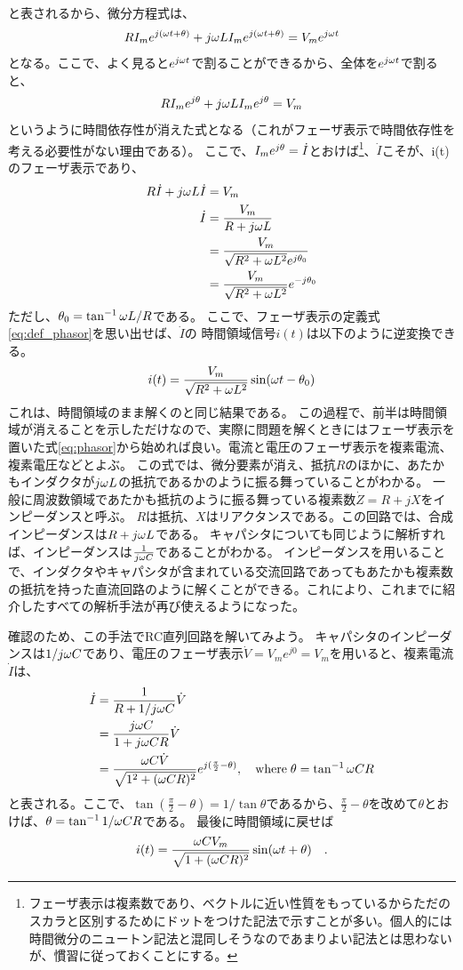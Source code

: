 \documentclass{ltjsreport}
\begin{document}
と表されるから、微分方程式は、
\[
  R I_m e^{j (\omega t + \theta)} + j\omega L I_m e^{j (\omega t + \theta)} = V_m e^{j \omega t}
\]
となる。ここで、よく見ると$e^{j \omega t}$で割ることができるから、全体を$e^{j \omega t}$で割ると、
\[
R I_m e^{j \theta} + j\omega L I_m e^{j \theta} = V_m
\]
というように時間依存性が消えた式となる（これがフェーザ表示で時間依存性を考える必要性がない理由である）。
ここで、$I_m e^{j \theta} = \dot{I}$とおけば\footnote{フェーザ表示は複素数であり、ベクトルに近い性質をもっているからただのスカラと区別するためにドットをつけた記法で示すことが多い。個人的には時間微分のニュートン記法と混同しそうなのであまりよい記法とは思わないが、慣習に従っておくことにする。}、$\dot{I}$こそが、i(t)のフェーザ表示であり、
\begin{align}\label{eq:phasor}
  R \dot{I} + j\omega L \dot{I} &= V_m\\
  \dot{I} &= \frac{V_m}{R+j\omega L}\\
    &= \frac{V_m}{\sqrt{R^2+\omega L^2}e^{j \theta_0}}\\
    &=\frac{V_m}{\sqrt{R^2+\omega L^2}}e^{-j\theta_0}
\end{align}
ただし、$\theta_0 = \tan^{-1}\omega L/R$である。
ここで、フェーザ表示の定義式\eqref{eq:def_phasor}を思い出せば、$\dot{I}$の
時間領域信号$i(t)$は以下のように逆変換できる。
\[
  i(t) = \frac{V_m}{\sqrt{R^2+\omega L^2}}\sin(\omega t - \theta_0)
\]
これは、時間領域のまま解くのと同じ結果である。
この過程で、前半は時間領域が消えることを示しただけなので、実際に問題を解くときにはフェーザ表示を置いた式\eqref{eq:phasor}から始めれば良い。電流と電圧のフェーザ表示を複素電流、複素電圧などとよぶ。
この式では、微分要素が消え、抵抗$R$のほかに、あたかもインダクタが$j\omega L$の抵抗であるかのように振る舞っていることがわかる。
一般に周波数領域であたかも抵抗のように振る舞っている複素数$\dot{Z} = R + jX$をインピーダンスと呼ぶ。
$R$は抵抗、$X$はリアクタンスである。この回路では、合成インピーダンスは$R+j\omega L$である。
キャパシタについても同じように解析すれば、インピーダンスは$\frac{1}{j\omega C}$であることがわかる。
インピーダンスを用いることで、インダクタやキャパシタが含まれている交流回路であってもあたかも複素数の抵抗を持った直流回路のように解くことができる。これにより、これまでに紹介したすべての解析手法が再び使えるようになった。

確認のため、この手法でRC直列回路を解いてみよう。
キャパシタのインピーダンスは$1/j\omega C$であり、電圧のフェーザ表示$\dot{V} =V_m e^{j0}=V_m$を用いると、複素電流$\dot{I}$は、
\begin{align}
  \dot{I} &= \frac{1}{R+ 1/j\omega C} \dot{V}\\
          &= \frac{j\omega C}{1+j\omega C R}\dot{V}\\
          &= \frac{\omega C \dot{V}}{\sqrt{1^2+(\omega C R)^2}} e^{j(\frac{\pi}{2}-\theta)}, \quad \text{where} \; \theta = \tan^{-1} \omega C R
\end{align}
と表される。ここで、$\tan (\frac{\pi}{2}-\theta) = 1/\tan\theta$であるから、$\frac{\pi}{2}-\theta$を改めて$\theta$とおけば、$\theta = \tan^{-1}1/\omega C R$である。
最後に時間領域に戻せば
\[
  i(t) =\frac{\omega C V_m}{\sqrt{1+(\omega C R)^2}}\sin(\omega t + \theta) \quad .
  \]
\end{document}

